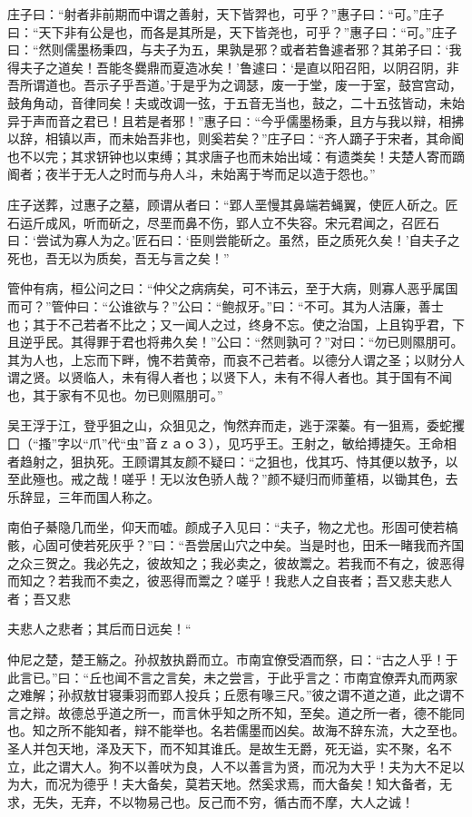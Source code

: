 \documentclass[12pt,UTF8]{ctexbook}
\begin{document}
庄子曰：“射者非前期而中谓之善射，天下皆羿也，可乎？”惠子曰：“可。”庄子曰：“天下非有公是也，而各是其所是，天下皆尧也，可乎？”惠子曰：“可。”庄子曰：“然则儒墨杨秉四，与夫子为五，果孰是邪？或者若鲁遽者邪？其弟子曰：‘我得夫子之道矣！吾能冬爨鼎而夏造冰矣！’鲁遽曰：‘是直以阳召阳，以阴召阴，非吾所谓道也。吾示子乎吾道。’于是乎为之调瑟，废一于堂，废一于室，鼓宫宫动，鼓角角动，音律同矣！夫或改调一弦，于五音无当也，鼓之，二十五弦皆动，未始异于声而音之君已！且若是者邪！”惠子曰∶“今乎儒墨杨秉，且方与我以辩，相拂以辞，相镇以声，而未始吾非也，则奚若矣？”庄子曰：“齐人蹢子于宋者，其命阍也不以完；其求钘钟也以束缚；其求唐子也而未始出域：有遗类矣！夫楚人寄而蹢阍者；夜半于无人之时而与舟人斗，未始离于岑而足以造于怨也。”

庄子送葬，过惠子之墓，顾谓从者曰：“郢人垩慢其鼻端若蝇翼，使匠人斫之。匠石运斤成风，听而斫之，尽垩而鼻不伤，郢人立不失容。宋元君闻之，召匠石曰：‘尝试为寡人为之。’匠石曰：‘臣则尝能斫之。虽然，臣之质死久矣！’自夫子之死也，吾无以为质矣，吾无与言之矣！”

管仲有病，桓公问之曰：“仲父之病病矣，可不讳云，至于大病，则寡人恶乎属国而可？”管仲曰：“公谁欲与？”公曰：“鲍叔牙。”曰：“不可。其为人洁廉，善士也；其于不己若者不比之；又一闻人之过，终身不忘。使之治国，上且钩乎君，下且逆乎民。其得罪于君也将弗久矣！”公曰：“然则孰可？”对曰：“勿已则隰朋可。其为人也，上忘而下畔，愧不若黄帝，而哀不己若者。以德分人谓之圣；以财分人谓之贤。以贤临人，未有得人者也；以贤下人，未有不得人者也。其于国有不闻也，其于家有不见也。勿已则隰朋可。”

吴王浮于江，登乎狙之山，众狙见之，恂然弃而走，逃于深蓁。有一狙焉，委蛇攫囗（“搔”字以“爪”代“虫”音ｚａｏ３），见巧乎王。王射之，敏给搏捷矢。王命相者趋射之，狙执死。王顾谓其友颜不疑曰：“之狙也，伐其巧、恃其便以敖予，以至此殛也。戒之哉！嗟乎！无以汝色骄人哉？”颜不疑归而师董梧，以锄其色，去乐辞显，三年而国人称之。

南伯子綦隐几而坐，仰天而嘘。颜成子入见曰：“夫子，物之尤也。形固可使若槁骸，心固可使若死灰乎？”曰：“吾尝居山穴之中矣。当是时也，田禾一睹我而齐国之众三贺之。我必先之，彼故知之；我必卖之，彼故鬻之。若我而不有之，彼恶得而知之？若我而不卖之，彼恶得而鬻之？嗟乎！我悲人之自丧者；吾又悲夫悲人者；吾又悲

夫悲人之悲者；其后而日远矣！“

仲尼之楚，楚王觞之。孙叔敖执爵而立。市南宜僚受酒而祭，曰：“古之人乎！于此言已。”曰：“丘也闻不言之言矣，未之尝言，于此乎言之：市南宜僚弄丸而两家之难解；孙叔敖甘寝秉羽而郢人投兵；丘愿有喙三尺。”彼之谓不道之道，此之谓不言之辩。故德总乎道之所一，而言休乎知之所不知，至矣。道之所一者，德不能同也。知之所不能知者，辩不能举也。名若儒墨而凶矣。故海不辞东流，大之至也。圣人并包天地，泽及天下，而不知其谁氏。是故生无爵，死无谥，实不聚，名不立，此之谓大人。狗不以善吠为良，人不以善言为贤，而况为大乎！夫为大不足以为大，而况为德乎！夫大备矣，莫若天地。然奚求焉，而大备矣！知大备者，无求，无失，无弃，不以物易己也。反己而不穷，循古而不摩，大人之诚！
\end{document}
